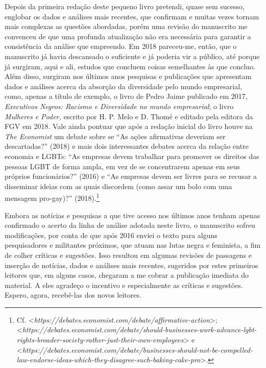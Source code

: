 Depois da primeira redação deste pequeno livro pretendi, quase sem
sucesso, englobar os dados e análises mais recentes, que confirmam e
muitas vezes tornam mais complexas as questões abordadas, porém uma
revisão do manuscrito me convenceu de que uma profunda atualização não
era necessária para garantir a consistência da análise que empreendo. Em
2018 pareceu-me, então, que o manuscrito já havia descansado o
suficiente e já poderia vir a público, até porque já surgiram, aqui e
ali, estudos que concluem coisas semelhantes às que concluo. Além disso,
surgiram nos últimos anos pesquisas e publicações que apresentam dados e
análises acerca da absorção da diversidade pelo mundo empresarial, como,
apenas a título de exemplo, o livro de Pedro Jaime publicado em 2017,
\emph{Executivos Negros: Racismo e Diversidade no mundo empresarial}; o
livro \emph{Mulheres e Poder,} escrito por H. P. Melo e D. Thomé e
editado pela editora da FGV em 2018. Vale ainda pontuar que após a
redação inicial do livro houve na \emph{The Economist} um debate sobre
se ``As ações afirmativas deveriam ser descartadas?'' (2018) e mais dois
interessantes debates acerca da relação entre economia e LGBTs: ``As
empresas devem trabalhar para promover os direitos das pessoas LGBT de
forma ampla, em vez de se concentrarem apenas em seus próprios
funcionários?'' (2016) e ``As empresas devem ser livres para se recusar
a disseminar ideias com as quais discordem (como assar um bolo com uma
mensagem pro-gay)?'' (2018).\footnote{Cf.
  \textless{}\emph{https://debates.economist.com/debate/affirmative-action}\textgreater{};
  \textless{}\emph{https://debates.economist.com/debate/should-businesses-work-advance-lgbt-rights-broader-society-rather-just-their-own-employees}\textgreater{} e
  \textless{}\emph{https://debates.economist.com/debate/businesses-should-not-be-compelled-law-endorse-ideas-which-they-disagree-such-baking-cake-pro}\textgreater{}.}

Embora as notícias e pesquisas a que tive acesso nos últimos anos tenham
apenas confirmado o acerto da linha de análise adotada neste livro, o
manuscrito sofreu modificações, por conta de que após 2016 enviei o
texto para alguns pesquisadores e militantes próximos, que atuam nas
lutas negra e feminista, a fim de colher críticas e sugestões. Isso
resultou em algumas revisões de passagens e inserção de notícias, dados
e análises mais recentes, sugeridos por estes primeiros leitores que, em
alguns casos, chegaram a me cobrar a publicação imediata do material. A
eles agradeço o incentivo e especialmente as críticas e sugestões.
Espero, agora, recebê-las dos novos leitores.

